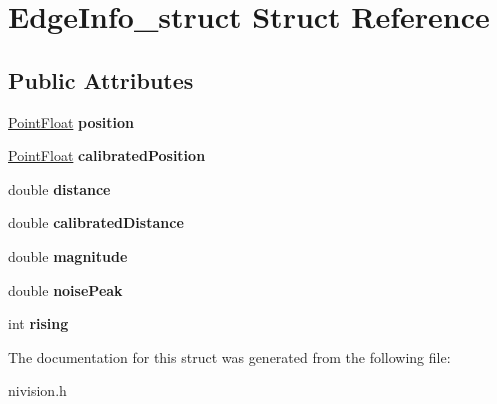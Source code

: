 \hypertarget{structEdgeInfo__struct}{\section{\-Edge\-Info\-\_\-struct \-Struct \-Reference}
\label{structEdgeInfo__struct}
}
\subsection*{\-Public \-Attributes}
\begin{DoxyCompactItemize}
\item 
\hypertarget{structEdgeInfo__struct_a543af6912de90b9b86264463f0c6daf8}{\hyperlink{structPointFloat__struct}{\-Point\-Float} {\bfseries position}}\label{structEdgeInfo__struct_a543af6912de90b9b86264463f0c6daf8}

\item 
\hypertarget{structEdgeInfo__struct_a0c49ed4edacae6bde0f72c17c1a5df03}{\hyperlink{structPointFloat__struct}{\-Point\-Float} {\bfseries calibrated\-Position}}\label{structEdgeInfo__struct_a0c49ed4edacae6bde0f72c17c1a5df03}

\item 
\hypertarget{structEdgeInfo__struct_a153ae30d34080e6245a07da8609b5711}{double {\bfseries distance}}\label{structEdgeInfo__struct_a153ae30d34080e6245a07da8609b5711}

\item 
\hypertarget{structEdgeInfo__struct_a4685297d102c2d351ec07074d0148bdb}{double {\bfseries calibrated\-Distance}}\label{structEdgeInfo__struct_a4685297d102c2d351ec07074d0148bdb}

\item 
\hypertarget{structEdgeInfo__struct_a334ae7914f16a4850a434bd02609d732}{double {\bfseries magnitude}}\label{structEdgeInfo__struct_a334ae7914f16a4850a434bd02609d732}

\item 
\hypertarget{structEdgeInfo__struct_acba687524ba6cabb118548f5b1a62d32}{double {\bfseries noise\-Peak}}\label{structEdgeInfo__struct_acba687524ba6cabb118548f5b1a62d32}

\item 
\hypertarget{structEdgeInfo__struct_aeb6076edae5deb044ad6e0a1acff8e16}{int {\bfseries rising}}\label{structEdgeInfo__struct_aeb6076edae5deb044ad6e0a1acff8e16}

\end{DoxyCompactItemize}


\-The documentation for this struct was generated from the following file\-:\begin{DoxyCompactItemize}
\item 
nivision.\-h\end{DoxyCompactItemize}
